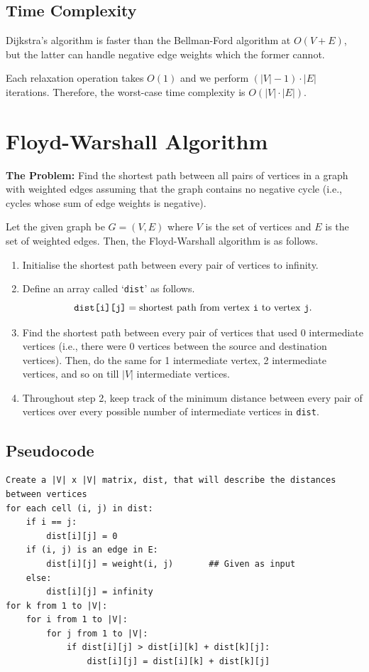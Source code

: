 \documentclass[12pt, a4paper]{article}
\theoremstyle{definition}
\theoremstyle{remark}
\begin{document}
\subsection{Time Complexity}
Dijkstra's algorithm is faster than the Bellman-Ford algorithm at $O(V + E)$, but the latter can handle negative edge weights which the former cannot.

Each relaxation operation takes $O(1)$ and we perform $(|V|-1)\cdot|E|$ iterations. Therefore, the worst-case time complexity is $O(|V|\cdot|E|)$.



\section{Floyd-Warshall Algorithm}
\begin{tcolorbox}
    \textbf{The Problem:} Find the shortest path between all pairs of vertices in a graph with weighted edges assuming that the graph contains no negative cycle (i.e., cycles whose sum of edge weights is negative).
\end{tcolorbox}

Let the given graph be $G = (V, E)$ where $V$ is the set of vertices and $E$ is the set of weighted edges.
Then, the Floyd-Warshall algorithm is as follows.
\begin{enumerate}
    \item Initialise the shortest path between every pair of vertices to infinity.
    \item Define an array called `\texttt{dist}' as follows.
          \begin{equation}
              \texttt{dist[i][j]} = \text{shortest path from vertex \texttt{i} to vertex \texttt{j}}.
          \end{equation}
    \item Find the shortest path between every pair of vertices that used 0 intermediate vertices (i.e., there were 0 vertices between the source and destination vertices). Then, do the same for 1 intermediate vertex, 2 intermediate vertices, and so on till $|V|$ intermediate vertices.
    \item Throughout step 2, keep track of the minimum distance between every pair of vertices over every possible number of intermediate vertices in \texttt{dist}.
\end{enumerate}

\subsection{Pseudocode} \label{floydwarshall:pseudocode}
\begin{lstlisting}
Create a |V| x |V| matrix, dist, that will describe the distances between vertices
for each cell (i, j) in dist:
    if i == j:
        dist[i][j] = 0
    if (i, j) is an edge in E:
        dist[i][j] = weight(i, j)       ## Given as input
    else:
        dist[i][j] = infinity
for k from 1 to |V|:
    for i from 1 to |V|:
        for j from 1 to |V|:
            if dist[i][j] > dist[i][k] + dist[k][j]:
                dist[i][j] = dist[i][k] + dist[k][j]
\end{lstlisting}
\end{document}
